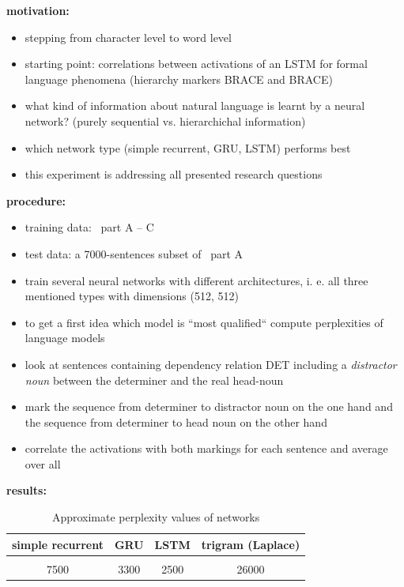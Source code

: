 \begin{frame}{\expv}
	\textbf{motivation:}
	\begin{itemize} %
		\item stepping from character level to word level
		\item starting point: correlations between activations of an LSTM for formal language phenomena (hierarchy markers BRACE and BRACE)
		\item what kind of information about natural language is learnt by a neural network? (purely sequential vs. hierarchichal information)
		\item which network type (simple recurrent, GRU, LSTM) performs best %
		\item this experiment is addressing all presented research questions		
	\end{itemize}
\end{frame}
\begin{frame}{\expv}
	\textbf{procedure:}
	\begin{itemize}
		\item training data: \hdt~part A -- C
		\item test data: a 7000-sentences subset of \hdt~part A
		\item train several neural networks with different architectures, i. e. all three mentioned types with dimensions (512, 512) 
		\item to get a first idea which model is “most qualified“ compute perplexities of language models
		\item look at sentences containing dependency relation DET including a \textit{distractor noun} between the determiner and the real head-noun
		\item mark the sequence from determiner to distractor noun on the one hand and the sequence from determiner to head noun on the other hand %
		\item correlate the activations with both markings for each sentence and average over all
	\end{itemize}
\end{frame}
\begin{frame}{\expv}
	\textbf{results:}
	\begin{table}
		\centering
		\begin{tabular}{c|c|c||c}
			simple recurrent & GRU & LSTM & trigram (Laplace)\\
			\hline \\
			7500 & 3300 & 2500 & 26000
		\end{tabular}
		\caption{Approximate perplexity values of networks}
	\end{table}
\end{frame}

